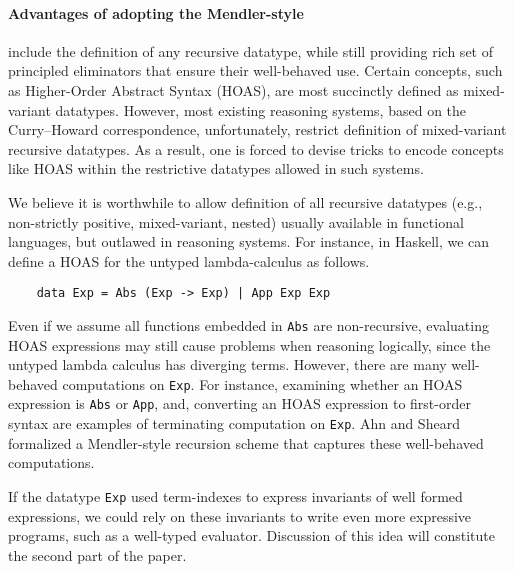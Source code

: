 \documentclass[a4paper]{easychair} %
\newcommand{\eg}[0]{{e.g.}}
\begin{document}
\paragraph{Advantages of adopting the Mendler-style\!\!\!}
include the definition of
any recursive datatype, while still providing rich set of
principled eliminators that ensure their well-behaved use.
Certain concepts, such as Higher-Order Abstract Syntax
(HOAS), are most succinctly defined as mixed-variant datatypes.
However, most existing reasoning systems, based on the
Curry--Howard correspondence, unfortunately, restrict
definition of mixed-variant recursive datatypes. As a result, one is forced to devise
tricks to encode concepts like HOAS within the restrictive datatypes allowed in such systems.


We believe it is worthwhile to allow definition of all recursive datatypes
(\eg, non-strictly positive, mixed-variant, nested)
usually available in functional languages, but outlawed in reasoning systems. For instance,
in Haskell, we can define a HOAS for the untyped lambda-calculus
as follows.
\begin{verbatim}
    data Exp = Abs (Exp -> Exp) | App Exp Exp
\end{verbatim}
Even if we assume all functions embedded in \texttt{Abs} are non-recursive,
evaluating HOAS expressions may still cause problems when reasoning logically,
since the untyped lambda calculus has diverging terms. However, there are
many well-behaved computations on \texttt{Exp}. For instance, examining whether
an HOAS expression is \texttt{Abs} or \texttt{App}, and, converting an HOAS expression
to first-order syntax are examples of terminating computation on \texttt{Exp}.
Ahn and Sheard \cite{AhnShe11} formalized a Mendler-style recursion scheme
that captures these well-behaved computations.

If the datatype \texttt{Exp} used term-indexes to express invariants of well
formed expressions, we could rely on these invariants to write even more expressive
programs, such as a well-typed evaluator. Discussion of this idea
will constitute the second part of the paper.
\end{document}
